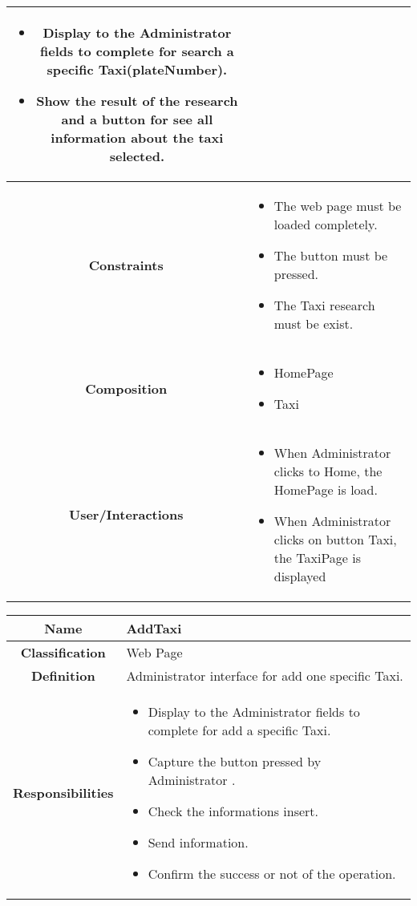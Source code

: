 \documentclass[11pt, a4paper,titlepage]{article}
\begin{document}
\begin{enumerate}
\begin{tabularx}{\textwidth}{| c | X |}
\begin{itemize}
		\item Display to the Administrator fields to complete for search a specific Taxi(plateNumber).
		\item Show the result of the research and a button for see all information about the taxi selected.
	\end{itemize}
	\\
	\hline
	\textbf{Constraints} &
	\begin{itemize}
		\item  The web page must be loaded completely.
		\item The button must be pressed.
		\item The Taxi research must be exist.
	\end{itemize}
	\\
	\hline
	\textbf{Composition} &
	\begin{itemize}
		\item HomePage
		\item Taxi
	\end{itemize}
	\\
	\hline
	\textbf{User/Interactions} &
	\begin{itemize}
		\item When Administrator clicks to Home, the HomePage is load.	
		\item When Administrator clicks on button Taxi, the TaxiPage is displayed
	\end{itemize}
	\\
	\hline 
\end{tabularx}
\begin{tabularx}{\textwidth}{| c | X |}
	\hline
	\textbf{Name} &
	AddTaxi
	\\
	\hline
	\textbf{Classification} &
	Web Page
	\\
	\hline
	\textbf{Definition} &
	Administrator interface for add one specific Taxi.\\
	\hline
	\textbf{Responsibilities} &
	\begin{itemize}
		\item Display to the Administrator fields to complete for add a specific Taxi.
		\item Capture the button pressed by Administrator .	
		\item Check the informations insert.
		\item Send information.
		\item Confirm the success or not of the operation.
	\end{itemize}
	\\

\end{tabularx}
\end{enumerate}
\end{document}

